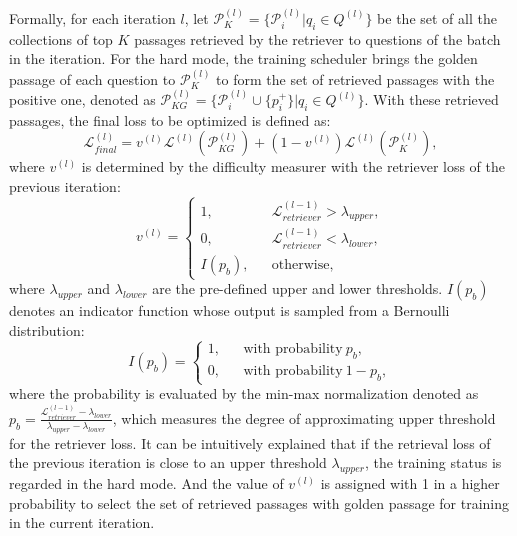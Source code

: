 Formally, for each iteration $l$, let $\mathcal{P}^{(l)}_K=\{\mathcal{P}^{(l)}_i|q_i\in Q^{(l)}\}$ be the set of all the collections of top $K$ passages retrieved by the retriever to questions of the batch in the iteration. For the hard mode, the training scheduler brings the golden passage of each question to $\mathcal{P}^{(l)}_K$ to form the set of retrieved passages with the positive one, denoted as $\mathcal{P}^{(l)}_{KG}=\{\mathcal{P}^{(l)}_i\cup\{p^+_i\}|q_i\in Q^{(l)}\}$. With these retrieved passages, the final loss to be optimized is defined as:
\begin{equation}\label{eq:final}
    \mathcal{L}^{(l)}_{final} = v^{(l)}\mathcal{L}^{(l)}(\mathcal{P}_{KG}^{(l)})+(1-v^{(l)})\mathcal{L}^{(l)}(\mathcal{P}^{(l)}_{K}),
\end{equation}
where $v^{(l)}$ is determined by the difficulty measurer with the retriever loss of the previous iteration:
\begin{equation}\label{eq:v}
    v^{(l)}=\left\{
    \begin{array}{ccl}
     1,  & & {\mathcal{L}^{(l-1)}_{retriever}>\lambda_{upper}}, \\
     0,  & & {\mathcal{L}^{(l-1)}_{retriever}<\lambda_{lower}}, \\
     I(p_b), & & {\text{otherwise}},
    \end{array} \right.
\end{equation}
where $\lambda_{upper}$ and $\lambda_{lower}$ are the pre-defined upper and lower thresholds. $I(p_b)$ denotes an indicator function whose output is sampled from a Bernoulli distribution:
\begin{equation}
    I(p_b)=\left\{
    \begin{array}{ccl}
     1,  & & {\text{with probability}\ p_b}, \\
     0,  & & {\text{with probability}\ 1-p_b}, 
    \end{array} \right.
\end{equation}
where the probability is evaluated by the min-max normalization denoted as $p_b=\frac{ \mathcal{L}^{(l-1)}_{retriever}-\lambda_{lower}}{\lambda_{upper} - \lambda_{lower}}$, which measures the degree of approximating upper threshold for the retriever loss.
It can be intuitively explained that if the retrieval loss of the previous iteration is close to an upper threshold $\lambda_{upper}$, the training status is regarded in the hard mode.
And the value of $v^{(l)}$ is assigned with 1 in a higher probability to select the set of retrieved passages with golden passage for training in the current iteration.

